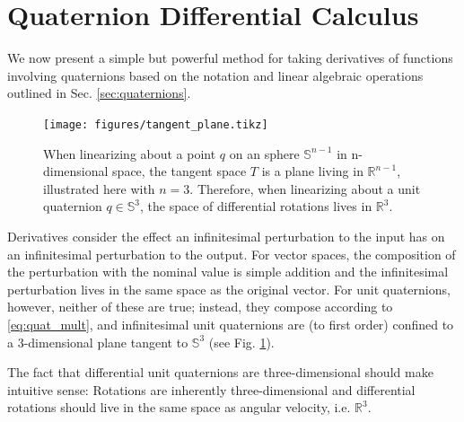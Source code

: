 \documentclass[letterpaper, 10 pt, conference]{ieeeconf}  %
\newcommand{\R}{\mathbb{R}}
\newcommand{\Q}{\mathbb{S}^3}
\begin{document}
\section{Quaternion Differential Calculus} \label{sec:Quaternion_Calculus}
    We now present a simple but powerful method for taking derivatives of functions 
    involving quaternions based on the notation and linear algebraic operations outlined 
    in Sec. \ref{sec:quaternions}.
    
    \begin{figure}
        \centering
        \texttt{[image: figures/tangent\_plane.tikz]}
        \caption{
            When linearizing about a point $q$ on an sphere $\mathbb{S}^{n-1}$ in 
            n-dimensional space, the tangent space $T$ is a plane living in $\R^{n-1}$, 
            illustrated here with $n=3$. Therefore, when linearizing about a unit 
            quaternion $q \in \Q$, the space of differential rotations lives in $\R^3$.
        }
        \label{fig:tangent_plane}
    \end{figure}
        
        Derivatives consider the effect an infinitesimal perturbation to the input has on
        an infinitesimal perturbation to the output. For vector spaces, the composition
        of the perturbation with the nominal value is simple addition and the
        infinitesimal perturbation lives in the same space as the original vector. For
        unit quaternions, however, neither of these are true; instead, they compose
        according to \eqref{eq:quat_mult}, and infinitesimal unit quaternions are (to
        first order) confined to a 3-dimensional plane tangent to $\Q$ (see Fig.
        \ref{fig:tangent_plane}).

        The fact that differential unit quaternions are three-dimensional should make
        intuitive sense: Rotations are inherently three-dimensional and differential
        rotations should live in the same space as angular velocity, i.e. $\R^3$.
        
\end{document}
